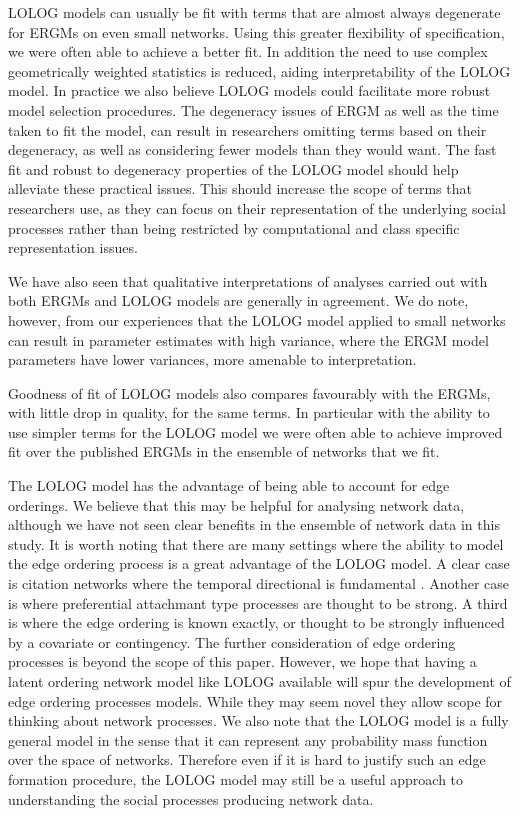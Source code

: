 \documentclass[
]{statsoc}
\begin{document}
LOLOG models can usually be fit with terms that are almost always
degenerate for ERGMs on even small networks. Using this greater
flexibility of specification, we were often able to achieve a better
fit. In addition the need to use complex geometrically weighted
statistics is reduced, aiding interpretability of the LOLOG model. In
practice we also believe LOLOG models could facilitate more robust model
selection procedures. The degeneracy issues of ERGM as well as the time
taken to fit the model, can result in researchers omitting terms based
on their degeneracy, as well as considering fewer models than they would
want. The fast fit and robust to degeneracy properties of the LOLOG
model should help alleviate these practical issues. This should increase
the scope of terms that researchers use, as they can focus on their
representation of the underlying social processes rather than being
restricted by computational and class specific representation issues.

We have also seen that qualitative interpretations of analyses carried
out with both ERGMs and LOLOG models are generally in agreement. We do
note, however, from our experiences that the LOLOG model applied to
small networks can result in parameter estimates with high variance,
where the ERGM model parameters have lower variances, more amenable to
interpretation.

Goodness of fit of LOLOG models also compares favourably with the ERGMs,
with little drop in quality, for the same terms. In particular with the
ability to use simpler terms for the LOLOG model we were often able to
achieve improved fit over the published ERGMs in the ensemble of
networks that we fit.

The LOLOG model has the advantage of being able to account for edge
orderings. We believe that this may be helpful for analysing network
data, although we have not seen clear benefits in the ensemble of
network data in this study. It is worth noting that there are many
settings where the ability to model the edge ordering process is a great
advantage of the LOLOG model. A clear case is citation networks where
the temporal directional is fundamental \citep{McLeveyetal2018}. Another
case is where preferential attachmant type processes are thought to be
strong. A third is where the edge ordering is known exactly, or thought
to be strongly influenced by a covariate or contingency. The further
consideration of edge ordering processes is beyond the scope of this
paper. However, we hope that having a latent ordering network model like
LOLOG available will spur the development of edge ordering processes
models. While they may seem novel they allow scope for thinking about
network processes. We also note that the LOLOG model is a fully general
model in the sense that it can represent any probability mass function
over the space of networks. Therefore even if it is hard to justify such
an edge formation procedure, the LOLOG model may still be a useful
approach to understanding the social processes producing network data.
\end{document}
